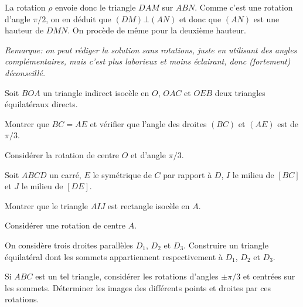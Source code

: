 \begin{exo}
\begin{sol}
La rotation $\rho$ envoie donc le triangle $DAM$ sur $ABN$. Comme c'est une rotation d'angle $\pi/2$, on en déduit que $(DM)\bot (AN)$ et donc que $(AN)$ est une hauteur de $DMN$. On procède de même pour la deuxième hauteur.

\emph{Remarque: on peut rédiger la solution sans rotations, juste en utilisant des angles complémentaires, mais c'est plus laborieux et moins éclairant, donc (fortement) déconseillé.}
\end{sol}
\end{exo}




\begin{exo} %
Soit $BOA$ un triangle indirect isocèle en $O$, $OAC$ et $OEB$  deux triangles équilatéraux directs.

Montrer que $BC = AE$ et vérifier que l'angle des droites $(BC)$ et $(AE)$ est de $\pi/3$.
\begin{hint}   
Considérer la rotation de centre $O$ et d'angle $\pi/3$.
\end{hint}
\end{exo}  

\begin{exo}
Soit $ABCD$ un carré, $E$ le symétrique de $C$ par rapport à $D$, $I$  le milieu de $[BC]$ et $J$ le milieu de $[DE]$.

Montrer que le triangle $AIJ$ est rectangle isocèle en $A$.

\begin{hint}   
Considérer  une rotation de centre $A$.
\end{hint}
\end{exo}  


\begin{exo} %
On considère trois droites parallèles $D_1$, $D_2$ et $D_3$. Construire un triangle équilatéral dont les sommets appartiennent respectivement à $D_1$, $D_2$ et $D_3$. 
\begin{hint}   
Si $ABC$ est un tel triangle, considérer les rotations d'angles $\pm \pi/3$ et centrées sur les sommets. Déterminer les images des différents points et droites par ces rotations.
\end{hint}
\end{exo}  



